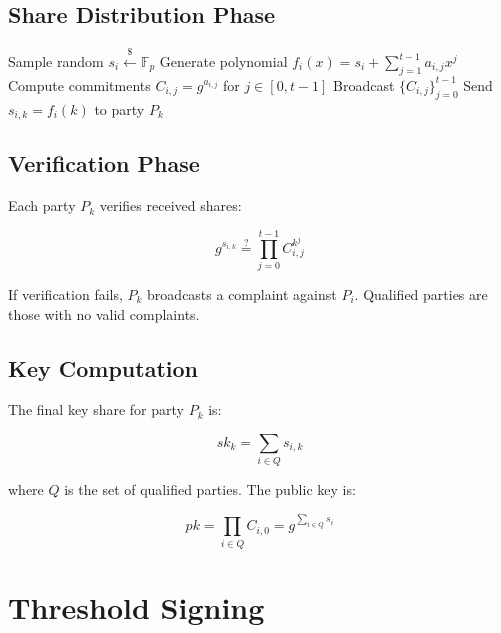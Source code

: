 \documentclass[11pt,twocolumn]{article}
\begin{document}
\subsection{Share Distribution Phase}

\begin{algorithm}
\caption{DKG Share Distribution}
\label{alg:dkg-share}
\begin{algorithmic}[1]
    \State Sample random $s_i \xleftarrow{\$} \mathbb{F}_p$
    \State Generate polynomial $f_i(x) = s_i + \sum_{j=1}^{t-1} a_{i,j} x^j$
    \State Compute commitments $C_{i,j} = g^{a_{i,j}}$ for $j \in [0,t-1]$
    \State Broadcast $\{C_{i,j}\}_{j=0}^{t-1}$
        \State Send $s_{i,k} = f_i(k)$ to party $P_k$
    \EndFor
\EndProcedure
\end{algorithmic}
\end{algorithm}

\subsection{Verification Phase}

Each party $P_k$ verifies received shares:

\begin{equation}
g^{s_{i,k}} \stackrel{?}{=} \prod_{j=0}^{t-1} C_{i,j}^{k^j}
\end{equation}

If verification fails, $P_k$ broadcasts a complaint against $P_i$. Qualified parties are those with no valid complaints.

\subsection{Key Computation}

The final key share for party $P_k$ is:

\begin{equation}
sk_k = \sum_{i \in Q} s_{i,k}
\end{equation}

where $Q$ is the set of qualified parties. The public key is:

\begin{equation}
pk = \prod_{i \in Q} C_{i,0} = g^{\sum_{i \in Q} s_i}
\end{equation}

\section{Threshold Signing}
\end{document}
